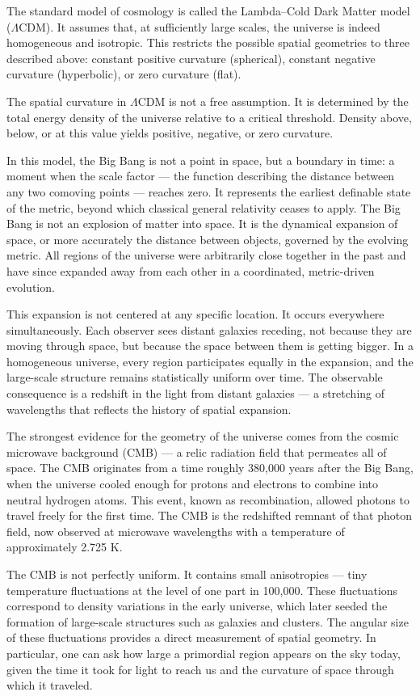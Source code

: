 The standard model of cosmology is called the Lambda–Cold Dark Matter model ($\Lambda$CDM). It assumes that, at sufficiently large scales, the universe is indeed homogeneous and isotropic. This restricts the possible spatial geometries to three described above: constant positive curvature (spherical), constant negative curvature (hyperbolic), or zero curvature (flat). 

The spatial curvature in $\Lambda$CDM is not a free assumption. It is determined by the total energy density of the universe relative to a critical threshold. Density above, below, or at this value yields positive, negative, or zero curvature.

In this model, the Big Bang is not a point in space, but a boundary in time: a moment when the scale factor — the function describing the distance between any two comoving points — reaches zero. It represents the earliest definable state of the metric, beyond which classical general relativity ceases to apply. The Big Bang is not an explosion of matter into space. It is the dynamical expansion of space, or more accurately the distance between objects, governed by the evolving metric. All regions of the universe were arbitrarily close together in the past and have since expanded away from each other in a coordinated, metric-driven evolution.

This expansion is not centered at any specific location. It occurs everywhere simultaneously. Each observer sees distant galaxies receding, not because they are moving through space, but because the space between them is getting bigger. In a homogeneous universe, every region participates equally in the expansion, and the large-scale structure remains statistically uniform over time. The observable consequence is a redshift in the light from distant galaxies — a stretching of wavelengths that reflects the history of spatial expansion.

The strongest evidence for the geometry of the universe comes from the cosmic microwave background (CMB) — a relic radiation field that permeates all of space. The CMB originates from a time roughly 380,000 years after the Big Bang, when the universe cooled enough for protons and electrons to combine into neutral hydrogen atoms. This event, known as recombination, allowed photons to travel freely for the first time. The CMB is the redshifted remnant of that photon field, now observed at microwave wavelengths with a temperature of approximately 2.725 K.

The CMB is not perfectly uniform. It contains small anisotropies — tiny temperature fluctuations at the level of one part in 100,000. These fluctuations correspond to density variations in the early universe, which later seeded the formation of large-scale structures such as galaxies and clusters. The angular size of these fluctuations provides a direct measurement of spatial geometry. In particular, one can ask how large a primordial region appears on the sky today, given the time it took for light to reach us and the curvature of space through which it traveled.

